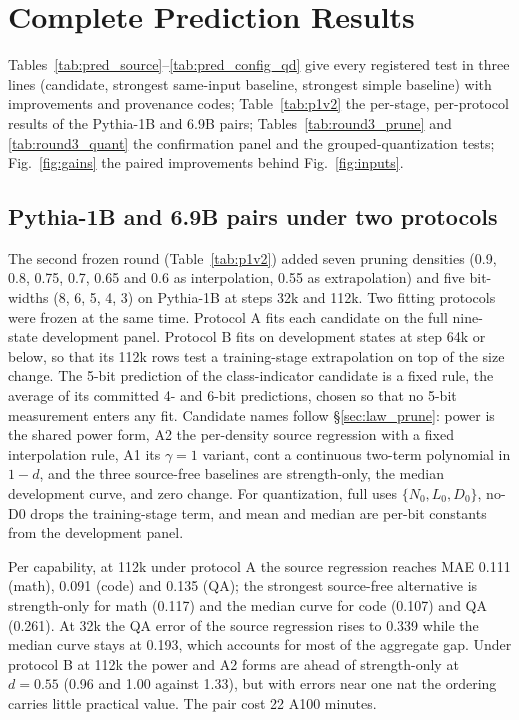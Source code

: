 \section{Complete Prediction Results}
\label{sec:app_results}
Tables~\ref{tab:pred_source}--\ref{tab:pred_config_qd} give every registered test in three lines (candidate,
strongest same-input baseline, strongest simple baseline) with improvements and provenance codes;
Table~\ref{tab:p1v2} the per-stage, per-protocol results of the Pythia-1B and 6.9B pairs; Tables~\ref{tab:round3_prune}
and \ref{tab:round3_quant} the confirmation panel and the grouped-quantization tests; Fig.~\ref{fig:gains} the paired
improvements behind Fig.~\ref{fig:inputs}.




\subsection{Pythia-1B and 6.9B pairs under two protocols}
\label{sec:app_p1v2}

The second frozen round (Table~\ref{tab:p1v2}) added seven pruning
densities (0.9, 0.8, 0.75, 0.7, 0.65 and 0.6 as interpolation, 0.55 as
extrapolation) and five bit-widths (8, 6, 5, 4, 3) on Pythia-1B at
steps 32k and 112k. Two fitting protocols were frozen at the same time.
Protocol A fits each candidate on the full nine-state development
panel. Protocol B fits on development states at step 64k or below, so
that its 112k rows test a training-stage extrapolation on top of the
size change. The 5-bit prediction of the class-indicator candidate is a
fixed rule, the average of its committed 4- and 6-bit predictions,
chosen so that no 5-bit measurement enters any fit. Candidate names
follow \S\ref{sec:law_prune}: power is the shared power form, A2 the
per-density source regression with a fixed interpolation rule, A1 its
$\gamma=1$ variant, cont a continuous two-term polynomial in $1-d$, and
the three source-free baselines are strength-only, the median
development curve, and zero change. For quantization, full uses
$\{N_0, L_0, D_0\}$, no-D0 drops the training-stage term, and mean and
median are per-bit constants from the development panel.

Per capability, at 112k under protocol A the source regression reaches
MAE 0.111 (math), 0.091 (code) and 0.135 (QA); the strongest
source-free alternative is strength-only for math (0.117) and the
median curve for code (0.107) and QA (0.261). At 32k the QA error of
the source regression rises to 0.339 while the median curve stays at
0.193, which accounts for most of the aggregate gap. Under protocol B at
112k the power and A2 forms are ahead of strength-only at $d=0.55$
(0.96 and 1.00 against 1.33), but with errors near one nat the ordering
carries little practical value. The pair cost 22 A100 minutes.

